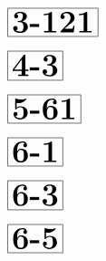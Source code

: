 \documentclass[a4paper, 10pt]{article}
\begin{document}
\begin{minipage}[t]{0.15\textwidth}
                \vspace*{-1.59cm}
        \hspace*{0.25cm}
        $\boxed{\textbf{\Huge3-121}}$
\end{minipage}
\begin{minipage}[t]{0.85\textwidth}
    
\end{minipage}

\begin{minipage}[t]{0.15\textwidth}
                \vspace*{-1.59cm}
        \hspace*{1.25cm}
        $\boxed{\textbf{\Huge4-3}}$
\end{minipage}
\begin{minipage}[t]{0.85\textwidth}
    
\end{minipage}

\begin{minipage}[t]{0.15\textwidth}
                \vspace*{-1.59cm}
        \hspace*{0.75cm}
        $\boxed{\textbf{\Huge5-61}}$
\end{minipage}
\begin{minipage}[t]{0.85\textwidth}
    
\end{minipage}

\thispagestyle{empty}
\begin{minipage}[t]{0.15\textwidth}
                \vspace*{-1.59cm}
        \hspace*{1.25cm}
        $\boxed{\textbf{\Huge6-1}}$
\end{minipage}
\begin{minipage}[t]{0.85\textwidth}
    
\end{minipage}

\begin{minipage}[t]{0.15\textwidth}
                \vspace*{-1.59cm}
        \hspace*{1.25cm}
        $\boxed{\textbf{\Huge6-3}}$
\end{minipage}
\begin{minipage}[t]{0.85\textwidth}
    
\end{minipage}

\begin{minipage}[t]{0.15\textwidth}
                \vspace*{-1.59cm}
        \hspace*{1.25cm}
        $\boxed{\textbf{\Huge6-5}}$
\end{minipage}
\begin{minipage}[t]{0.85\textwidth}
    
\end{minipage}
\end{document}
